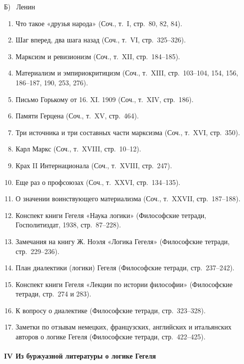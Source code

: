 \documentclass[twoside]{article}
\begin{document}
{\centering 
Б) \ Ленин
\par}

\begin{enumerate}
\item 
Что такое «друзья народа» (Соч., т.~I, стр.~80, 82, 84).
\item 
Шаг вперед, два шага назад (Соч., т.~VI, стр.~325–326).
\item 
Марксизм и ревизионизм (Соч., т.~XII, стр.~184–185).
\item 
Материализм и эмпириокритицизм (Соч., т.~XIII, стр.~103–104, 154, 156, 
186–187, 190, 253, 276).
\item 
Письмо Горькому от 16. XI. 1909 (Соч., т.~XIV, стр.~186).
\item 
Памяти Герцена (Соч., т.~XV, стр.~464).
\item 
Три источника и три составных части марксизма (Соч., т.~XVI, стр.~350).
\item 
Карл Маркс (Соч., т.~XVIII, стр.~10–12).
\item 
Крах II Интернационала (Соч., т.~XVIII, стр.~247).
\item 
Еще раз о профсоюзах (Соч., т.~XXVI, стр.~134–135).
\item 
О значении воинствующего материализма (Соч., т.~XXVII, стр.~187–188).
\item 
Конспект книги Гегеля «Наука логики» (Философские тетради, Госполитиздат, 
1938, стр.~87–228).
\item 
Замечания на книгу Ж. Ноэля «Логика Гегеля» (Философские тетради, 
стр.~229–236).
\item 
План диалектики (логики) Гегеля (Философские тетради, стр.~237–242).
\item 
Конспект книги Гегеля «Лекции по истории философии» (Философские тетради, 
стр.~274 и 283).
\item 
К вопросу о диалектике (Философские тетради, стр.~323–328).
\item 
Заметки по отзывам немецких, французских, английских и итальянских авторов 
о логике Гегеля (Философские тетради, стр.~422–425).
\end{enumerate}

\paragraph[IV Из буржуазной литературы о логике Гегеля]
{IV Из буржуазной литературы о логике Гегеля}
\end{document}
